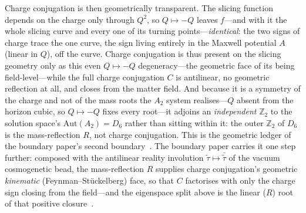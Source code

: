 \documentclass[11pt,a4paper]{article}
\theoremstyle{definition}
\begin{document}
Charge conjugation is then geometrically transparent. The slicing function depends on the charge only through $Q^{2}$, so $Q\mapsto-Q$ leaves $f$---and with it the whole slicing curve and every one of its turning points---\emph{identical}: the two signs of charge trace the one curve, the sign living entirely in the Maxwell potential $A$ (linear in $Q$), off the curve. Charge conjugation is thus present on the slicing geometry only as this even $Q\mapsto-Q$ degeneracy---the geometric face of its being field-level---while the full charge conjugation $C$ is antilinear, no geometric reflection at all, and closes from the matter field. And because it is a symmetry of the charge and not of the mass roots the $A_{2}$ system realises---$Q$ absent from the horizon cubic, so $Q\mapsto-Q$ fixes every root---it adjoins an \emph{independent} $\mathbb{Z}_{2}$ to the solution space's $\mathrm{Aut}(A_{2})=D_{6}$ rather than sitting within it: the outer $\mathbb{Z}_{2}$ of $D_{6}$ is the mass-reflection $R$, not charge conjugation. This is the geometric ledger of the boundary paper's second boundary~\cite{JanzenBoundary}. The boundary paper carries it one step further: composed with the antilinear reality involution $\tilde\tau\mapsto\bar{\tilde\tau}$ of the vacuum cosmogenetic bead, the mass-reflection $R$ supplies charge conjugation's geometric \emph{kinematic} (Feynman--St\"uckelberg) face, so that $C$ factorises with only the charge sign closing from the field---and the eigenspace split above is the linear ($R$) root of that positive closure~\cite{JanzenBoundary,JanzenMatter}.
\end{document}
